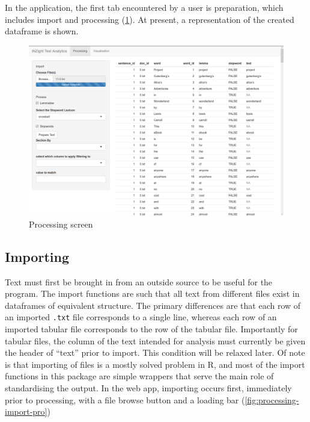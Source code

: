 \message{ !name(jason-cairns-dissertation.tex)}\documentclass[11pt, a4paper, titlepage]{report}
\begin{document}
In the application, the first tab encountered by a user is
preparation, which includes import and processing
(\cref{fig:processing-overview}). At present, a representation of the
created dataframe is shown.

\begin{figure}
\centering
\includegraphics[scale=0.35]{processing-overview.png}
\caption{Processing screen\label{fig:processing-overview}}
\end{figure}

\subsection{Importing}\label{sec:importing}

Text must first be brought in from an outside source to be useful for
the program. The import functions are such that all text from
different files exist in dataframes of equivalent structure. The
primary differences are that each row of an imported \texttt{.txt}
file corresponds to a single line, whereas each row of an imported
tabular file corresponds to the row of the tabular file. Importantly
for tabular files, the column of the text intended for analysis must
currently be given the header of ``text'' prior to import. This
condition will be relaxed later. Of note is that importing of files is
a mostly solved problem in R, and most of the import functions in this
package are simple wrappers that serve the main role of standardising
the output. In the web app, importing occurs first, immediately prior
to processing, with a file browse button and a loading bar
(\cref{fig:processing-import-pro})
\end{document}
